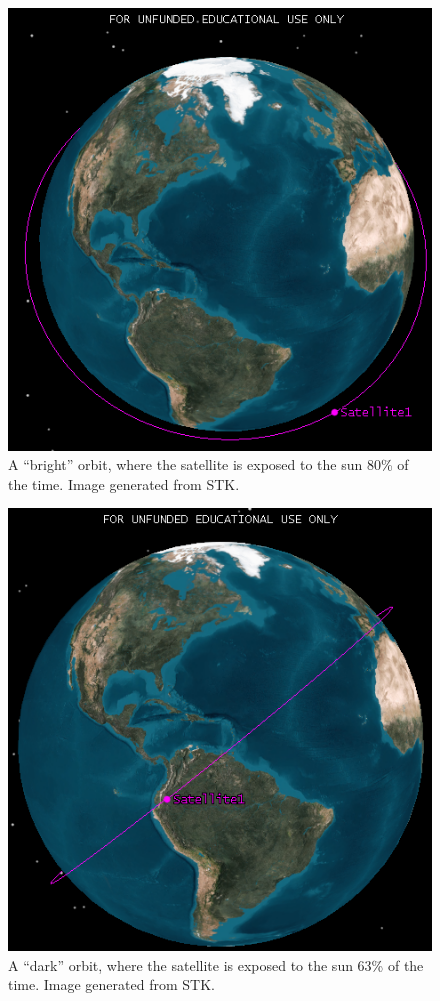 \documentclass[12pt]{article}
\begin{document}
\begin{figure}[ht]%
\centering
\includegraphics{images/power-bright-orbit}%
\caption{A ``bright'' orbit, where the satellite is exposed to the sun 80\% of the time.  Image generated from STK.}%
\label{fig:power-bright-orbit}%
\end{figure}

\begin{figure}[ht]%
\centering
\includegraphics{images/power-dark-orbit}%
\caption{A ``dark'' orbit, where the satellite is exposed to the sun 63\% of the time.  Image generated from STK.}%
\label{fig:power-dark-orbit}%
\end{figure}
\end{document}
